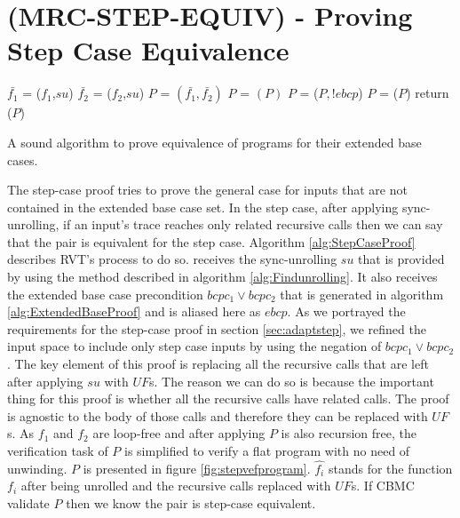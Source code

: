 \section{(MRC-STEP-EQUIV) - Proving Step Case Equivalence}
\label{sec:MRC-STEP-EQUIV}
\noindent
\begin{algorithm}
\begin{minipage}{\linewidth}
\begin{algorithmic}[1]
	\State$\bar{f_1}$ = ($f_1$,$su$)
	\State$\bar{f_2}$ = ($f_2$,$su$)
	\State $P$ = $(\bar{f_1},\bar{f_2})$
	\State $P$ = $(P)$
	\State $P$ = ($P,!ebcp$)
    \State $P$ = ($P$)
    \State return ($P$)
	\EndFunction
\end{algorithmic}
\end{minipage}
\caption{A sound algorithm to prove equivalence of programs for their extended base cases.}
\label{alg:StepCaseProof}
\end{algorithm}
The step-case proof tries to prove the general case for inputs that are not contained in the extended base case set. In the step case, after applying sync-unrolling, if an input's trace reaches only related recursive calls then we can say that the pair is equivalent for the step case. Algorithm \ref{alg:StepCaseProof} describes RVT's process to do so.
 receives the sync-unrolling $su$ that is provided by using the method described in algorithm \ref{alg:Findunrolling}. It also receives the extended base case precondition $bcpc_1 \lor bcpc_2$ that is generated in algorithm \ref{alg:ExtendedBaseProof} and is aliased here as $ebcp$. As we portrayed the requirements for the step-case proof in section \ref{sec:adaptstep}, we refined the input space to include only step case inputs by using the negation of $bcpc_1 \lor bcpc_2$. The key element of this proof is replacing all the recursive calls that are left after applying $su$ with $UF$s. The reason we can do so is because the important thing for this proof is whether all the recursive calls have related calls. The proof is agnostic to the body of those calls and therefore they can be replaced with $UF$s. As $f_1$ and $f_2$ are loop-free and after applying  $P$ is also recursion free, the verification task of $P$ is simplified to verify a flat program with no need of unwinding. $P$ is presented in figure \ref{fig:stepvefprogram}. $\hat{f_i}$ stands for the function $f_i$ after being unrolled and the recursive calls replaced with $UF$s. If CBMC validate $P$ then we know the pair is step-case equivalent. 
